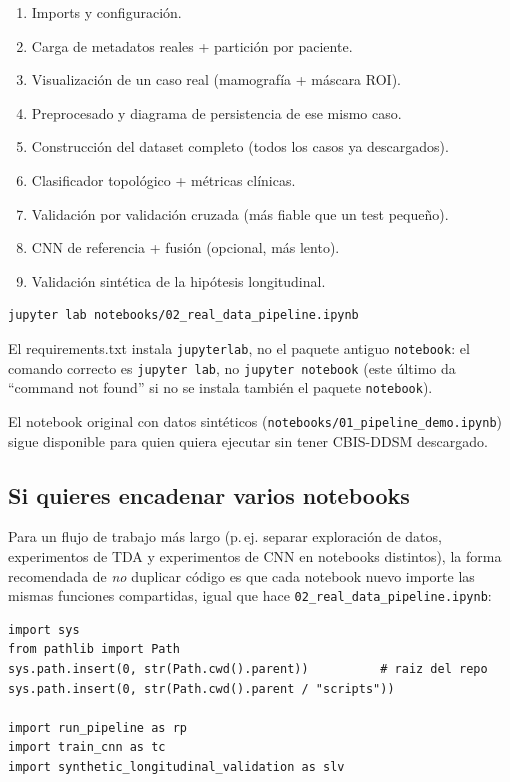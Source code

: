 \documentclass[11pt,a4paper]{article}
\begin{document}
\begin{enumerate}[leftmargin=1.2cm]
  \item Imports y configuración.
  \item Carga de metadatos reales + partición por paciente.
  \item Visualización de un caso real (mamografía + máscara ROI).
  \item Preprocesado y diagrama de persistencia de ese mismo caso.
  \item Construcción del dataset completo (todos los casos ya descargados).
  \item Clasificador topológico + métricas clínicas.
  \item Validación por validación cruzada (más fiable que un test pequeño).
  \item CNN de referencia + fusión (opcional, más lento).
  \item Validación sintética de la hipótesis longitudinal.
\end{enumerate}

\begin{lstlisting}
jupyter lab notebooks/02_real_data_pipeline.ipynb
\end{lstlisting}

El requirements.txt instala \texttt{jupyterlab}, no el paquete antiguo
\texttt{notebook}: el comando correcto es \texttt{jupyter lab}, no
\texttt{jupyter notebook} (este último da ``command not found'' si no se
instala también el paquete \texttt{notebook}).

El notebook original con datos sintéticos
(\texttt{notebooks/01\_pipeline\_demo.ipynb}) sigue disponible para quien
quiera ejecutar sin tener CBIS-DDSM descargado.

\subsection{Si quieres encadenar varios notebooks}

Para un flujo de trabajo más largo (p.\,ej. separar exploración de datos,
experimentos de TDA y experimentos de CNN en notebooks distintos), la forma
recomendada de \emph{no} duplicar código es que cada notebook nuevo importe
las mismas funciones compartidas, igual que hace
\texttt{02\_real\_data\_pipeline.ipynb}:

\begin{lstlisting}
import sys
from pathlib import Path
sys.path.insert(0, str(Path.cwd().parent))          # raiz del repo
sys.path.insert(0, str(Path.cwd().parent / "scripts"))

import run_pipeline as rp
import train_cnn as tc
import synthetic_longitudinal_validation as slv
\end{lstlisting}
\end{document}
